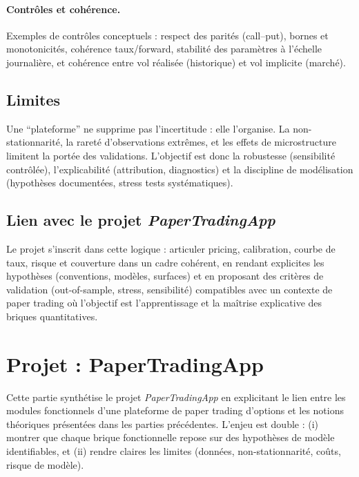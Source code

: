 \documentclass[11pt,a4paper]{article}
\newcommand{\1}{\mathbf{1}}
\begin{document}
\paragraph{Contr\^oles et coh\'erence.}
Exemples de contr\^oles conceptuels : respect des parit\'es (call--put), bornes et monotonicit\'es, coh\'erence taux/forward,
stabilit\'e des param\`etres \`a l'\'echelle journali\`ere, et coh\'erence entre vol r\'ealis\'ee (historique) et vol implicite (march\'e).

\subsection{Limites}

Une ``plateforme'' ne supprime pas l'incertitude : elle l'organise. La non-stationnarit\'e, la raret\'e d'observations extr\^emes, et les effets de microstructure
limitent la port\'ee des validations. L'objectif est donc la robustesse (sensibilit\'e contr\^ol\'ee), l'explicabilit\'e (attribution, diagnostics) et
la discipline de mod\'elisation (hypoth\`eses document\'ees, stress tests syst\'ematiques).

\subsection{Lien avec le projet \emph{PaperTradingApp}}

Le projet s'inscrit dans cette logique : articuler pricing, calibration, courbe de taux, risque et couverture dans un cadre coh\'erent, en rendant explicites
les hypoth\`eses (conventions, mod\`eles, surfaces) et en proposant des crit\`eres de validation (out-of-sample, stress, sensibilit\'e) compatibles avec un
contexte de paper trading o\`u l'objectif est l'apprentissage et la ma\^{i}trise explicative des briques quantitatives.




\section{Projet : PaperTradingApp}

Cette partie synth\'etise le projet \emph{PaperTradingApp} en explicitant le lien entre les modules fonctionnels d'une
plateforme de paper trading d'options et les notions th\'eoriques pr\'esent\'ees dans les parties pr\'ec\'edentes.
L'enjeu est double : (i) montrer que chaque brique fonctionnelle repose sur des hypoth\`eses de mod\`ele identifiables,
et (ii) rendre claires les limites (donn\'ees, non-stationnarit\'e, co\^uts, risque de mod\`ele).
\end{document}
